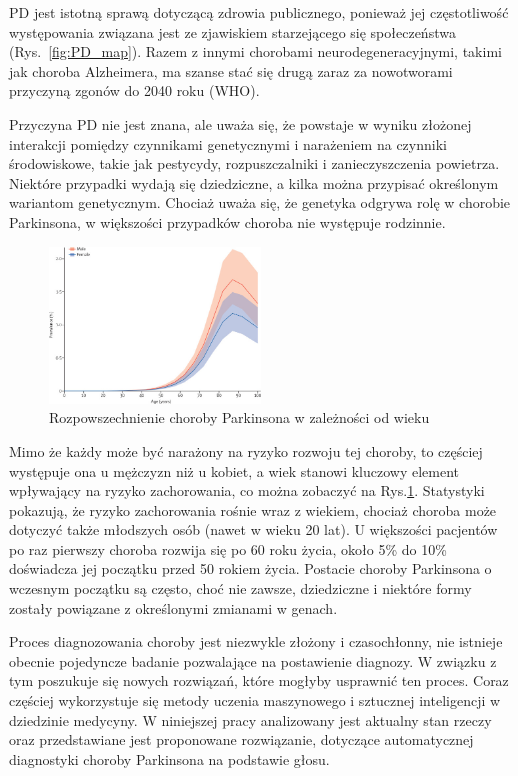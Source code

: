 PD jest istotną sprawą dotyczącą zdrowia publicznego, ponieważ jej częstotliwość występowania związana jest ze zjawiskiem starzejącego się społeczeństwa (Rys.~\ref{fig:PD_map}).
Razem z innymi chorobami neurodegeneracyjnymi, takimi jak choroba Alzheimera, ma szanse stać się drugą zaraz za nowotworami przyczyną zgonów do 2040 roku (WHO).

Przyczyna PD nie jest znana, ale uważa się, że powstaje w wyniku złożonej interakcji pomiędzy czynnikami genetycznymi i
narażeniem na czynniki środowiskowe, takie jak pestycydy, rozpuszczalniki i zanieczyszczenia powietrza.
Niektóre przypadki wydają się dziedziczne, a kilka można przypisać określonym wariantom genetycznym.
Chociaż uważa się, że genetyka odgrywa rolę w chorobie Parkinsona, w większości przypadków choroba nie występuje rodzinnie\cite{National_Institute_on_Aging_2022}.

\begin{figure}[htbp]
	\centering
	\includegraphics[width=0.5\textwidth]{./img/PD_prevalence}
	\caption{Rozpowszechnienie choroby Parkinsona w zależności od wieku \cite {global_PD}}
    \label{fig:PD_prevalance}
\end{figure}

Mimo że każdy może być narażony na ryzyko rozwoju tej choroby, to częściej występuje ona u mężczyzn niż u kobiet,
a wiek stanowi kluczowy element wpływający na ryzyko zachorowania, co można zobaczyć na Rys.\ref{fig:PD_prevalance}.
Statystyki pokazują, że ryzyko zachorowania rośnie wraz z wiekiem, chociaż choroba może dotyczyć także młodszych osób (nawet w wieku 20 lat).
U większości pacjentów po raz pierwszy choroba rozwija się po 60 roku życia, około 5\% do 10\% doświadcza jej początku przed 50 rokiem życia.
Postacie choroby Parkinsona o wczesnym początku są często, choć nie zawsze, dziedziczne i niektóre formy zostały powiązane z
określonymi zmianami w genach\cite{National_Institute_on_Aging_2022}.

Proces diagnozowania choroby jest niezwykle złożony i czasochłonny, nie istnieje obecnie pojedyncze badanie pozwalające na postawienie diagnozy.
W związku z tym poszukuje się nowych rozwiązań, które mogłyby usprawnić ten proces.
Coraz częściej wykorzystuje się metody uczenia maszynowego i sztucznej inteligencji w dziedzinie medycyny.
W niniejszej pracy analizowany jest aktualny stan rzeczy oraz przedstawiane jest proponowane rozwiązanie, dotyczące automatycznej diagnostyki
choroby Parkinsona na podstawie głosu.

